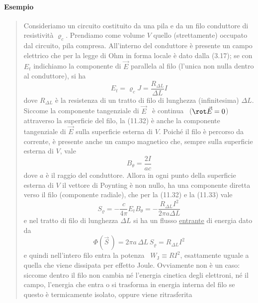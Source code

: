\paragraph{Esempio}
\begin{quote}
  Consideriamo un circuito costituito da una pila e da un filo conduttore di
  resistivit\`a $\varrho_c$. Prendiamo come volume $V$ quello (strettamente)
  occupato dal circuito, pila compresa. All'interno del conduttore \`e presente
  un campo elettrico che per la legge di Ohm in forma locale \`e dato dalla
  (3.17); se con $E_t$ indichiamo la componente di $\vec E$ parallela al filo
  (l'unica non nulla dentro al conduttore), si ha
  \begin{equation}
    E_t=\varrho_cJ=\frac{R_{\Delta L}}{\Delta L}I
    \tag{11.32}
  \end{equation}
  dove $R_{\Delta L}$ \`e la resistenza di un tratto di filo di lunghezza
  (infinitesima) $\Delta L$.\\
  Siccome la componente tangenziale di $\vec E$ \ \`e continua
  \ ($\rot\vec E=0$) attraverso la superficie del filo, la (11.32) \`e anche la
  componente tangenziale di $\vec E$ sulla superficie esterna di $V$. Poich\'e
  il filo \`e percorso da corrente, \`e presente anche un campo magnetico che,
  sempre sulla superficie esterna di $V$, vale
  \begin{equation}
    B_\theta=\frac{2I}{ac}
    \tag{11.33}
  \end{equation}
  dove $a$ \`e il raggio del conduttore. Allora in ogni punto della superficie
  esterna di $V$ il vettore di Poynting \`e non nullo, ha una componente diretta
  verso il filo (componente radiale), che per la (11.32) e la (11.33) vale
  \begin{equation}
    S_\varrho=-\frac{c}{4\pi}E_tB_\theta=-\frac{R_{\Delta L}I^2}{2\pi a\Delta L}
    \tag{11.34}
  \end{equation}
  e nel tratto di filo di lunghezza $\Delta L$ si ha un flusso
  \underline{entrante} di energia dato da
  \begin{equation}
    \Phi(\vec S\,)=2\pi a\,\Delta L\,S_\varrho=R_{\Delta L}I^2
    \tag{11.35}
  \end{equation}
  e quindi nell'intero filo entra la potenza \ $W_\mathrm{J}\equiv RI^2$,
  esattamente uguale a quella che viene dissipata per effetto Joule. Ovviamente
  non \`e un caso: siccome dentro il filo non cambia n\'e l'energia cinetica
  degli elettroni, n\'e il campo, l'energia che entra o si trasforma in energia
  interna del filo se questo \`e termicamente isolato, oppure viene ritrasferita

\end{quote}
